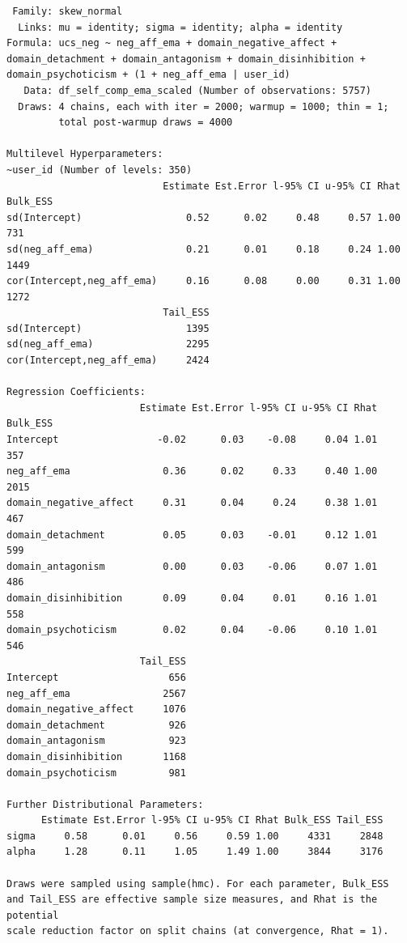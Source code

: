 \documentclass[
  11pt,
  a4paper,
  onecolumn]{article}
\begin{document}
\begin{verbatim}
 Family: skew_normal 
  Links: mu = identity; sigma = identity; alpha = identity 
Formula: ucs_neg ~ neg_aff_ema + domain_negative_affect + domain_detachment + domain_antagonism + domain_disinhibition + domain_psychoticism + (1 + neg_aff_ema | user_id) 
   Data: df_self_comp_ema_scaled (Number of observations: 5757) 
  Draws: 4 chains, each with iter = 2000; warmup = 1000; thin = 1;
         total post-warmup draws = 4000

Multilevel Hyperparameters:
~user_id (Number of levels: 350) 
                           Estimate Est.Error l-95% CI u-95% CI Rhat Bulk_ESS
sd(Intercept)                  0.52      0.02     0.48     0.57 1.00      731
sd(neg_aff_ema)                0.21      0.01     0.18     0.24 1.00     1449
cor(Intercept,neg_aff_ema)     0.16      0.08     0.00     0.31 1.00     1272
                           Tail_ESS
sd(Intercept)                  1395
sd(neg_aff_ema)                2295
cor(Intercept,neg_aff_ema)     2424

Regression Coefficients:
                       Estimate Est.Error l-95% CI u-95% CI Rhat Bulk_ESS
Intercept                 -0.02      0.03    -0.08     0.04 1.01      357
neg_aff_ema                0.36      0.02     0.33     0.40 1.00     2015
domain_negative_affect     0.31      0.04     0.24     0.38 1.01      467
domain_detachment          0.05      0.03    -0.01     0.12 1.01      599
domain_antagonism          0.00      0.03    -0.06     0.07 1.01      486
domain_disinhibition       0.09      0.04     0.01     0.16 1.01      558
domain_psychoticism        0.02      0.04    -0.06     0.10 1.01      546
                       Tail_ESS
Intercept                   656
neg_aff_ema                2567
domain_negative_affect     1076
domain_detachment           926
domain_antagonism           923
domain_disinhibition       1168
domain_psychoticism         981

Further Distributional Parameters:
      Estimate Est.Error l-95% CI u-95% CI Rhat Bulk_ESS Tail_ESS
sigma     0.58      0.01     0.56     0.59 1.00     4331     2848
alpha     1.28      0.11     1.05     1.49 1.00     3844     3176

Draws were sampled using sample(hmc). For each parameter, Bulk_ESS
and Tail_ESS are effective sample size measures, and Rhat is the potential
scale reduction factor on split chains (at convergence, Rhat = 1).
\end{verbatim}
\end{document}
